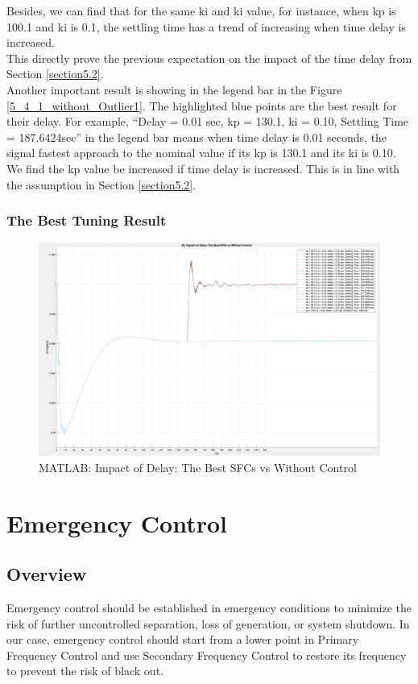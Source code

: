 \documentclass{report}
\begin{document}
Besides, we can find that for the same ki and ki value, for instance, when kp is 100.1 and ki is 0.1, the settling time has a trend of increasing when time delay is increased. \\

This directly prove the previous expectation on the impact of the time delay from Section \textcolor{red}{\ref{section5.2}}. \\


Another important result is showing in the legend bar in the Figure \textcolor{red}{\ref{5_4_1_without_Outlier1}}. The highlighted blue points are the best result for their delay. For example, “Delay = 0.01 sec, kp = 130.1, ki = 0.10, Settling Time = 187.6424sec” in the legend bar means when time delay is 0.01 seconds, the signal fastest approach to the nominal value if its kp is 130.1 and its ki is 0.10. We find the kp value be increased if time delay is increased. This is in line with the assumption in Section \textcolor{red}{\ref{section5.2}}.\\

\subsection{The Best Tuning Result} %
\begin{figure}[htbp]
\centering
\includegraphics[width = .819\textwidth]{figure/5_4_2.png}
\caption{MATLAB: Impact of Delay: The Best SFCs vs Without Control}
\label{5_4_2}
\end{figure}


\chapter{Emergency Control}
\label{Chapter6}
\section{Overview} %
Emergency  control should be established in emergency conditions to minimize the risk of further uncontrolled separation, loss of generation, or system shutdown. In our case, emergency control should start from a lower point in Primary Frequency Control and use Secondary Frequency Control to restore its frequency to prevent the risk of black out.\\
\end{document}
